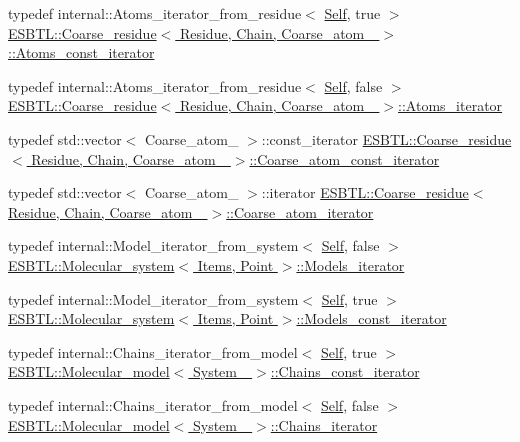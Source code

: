 \begin{DoxyCompactItemize}
\item 
typedef internal\+::\+Atoms\+\_\+iterator\+\_\+from\+\_\+residue$<$ \hyperlink{classESBTL_1_1Coarse__residue}{Self}, true $>$ \hyperlink{group__grp__iters_gabb95e73700fd84dbde6e089927e03a6d}{E\+S\+B\+T\+L\+::\+Coarse\+\_\+residue$<$ Residue, Chain, Coarse\+\_\+atom\+\_\+ $>$\+::\+Atoms\+\_\+const\+\_\+iterator}
\item 
typedef internal\+::\+Atoms\+\_\+iterator\+\_\+from\+\_\+residue$<$ \hyperlink{classESBTL_1_1Coarse__residue}{Self}, false $>$ \hyperlink{group__grp__iters_ga8081408a6d91ed2a777111e2b2651ad4}{E\+S\+B\+T\+L\+::\+Coarse\+\_\+residue$<$ Residue, Chain, Coarse\+\_\+atom\+\_\+ $>$\+::\+Atoms\+\_\+iterator}
\item 
typedef std\+::vector$<$ Coarse\+\_\+atom\+\_\+ $>$\+::const\+\_\+iterator \hyperlink{group__grp__iters_ga5a4a865846cdde342538df7fc03c80ce}{E\+S\+B\+T\+L\+::\+Coarse\+\_\+residue$<$ Residue, Chain, Coarse\+\_\+atom\+\_\+ $>$\+::\+Coarse\+\_\+atom\+\_\+const\+\_\+iterator}
\item 
typedef std\+::vector$<$ Coarse\+\_\+atom\+\_\+ $>$\+::iterator \hyperlink{group__grp__iters_ga09a38741d50d3b7296dae83eb0911e49}{E\+S\+B\+T\+L\+::\+Coarse\+\_\+residue$<$ Residue, Chain, Coarse\+\_\+atom\+\_\+ $>$\+::\+Coarse\+\_\+atom\+\_\+iterator}
\item 
typedef internal\+::\+Model\+\_\+iterator\+\_\+from\+\_\+system$<$ \hyperlink{classESBTL_1_1Molecular__system}{Self}, false $>$ \hyperlink{group__grp__iters_ga752760df14baf1b92dac469d712202bc}{E\+S\+B\+T\+L\+::\+Molecular\+\_\+system$<$ Items, Point $>$\+::\+Models\+\_\+iterator}
\item 
typedef internal\+::\+Model\+\_\+iterator\+\_\+from\+\_\+system$<$ \hyperlink{classESBTL_1_1Molecular__system}{Self}, true $>$ \hyperlink{group__grp__iters_ga6383c53b86af7a7a7376bce06e4febb8}{E\+S\+B\+T\+L\+::\+Molecular\+\_\+system$<$ Items, Point $>$\+::\+Models\+\_\+const\+\_\+iterator}
\item 
typedef internal\+::\+Chains\+\_\+iterator\+\_\+from\+\_\+model$<$ \hyperlink{classESBTL_1_1Molecular__model}{Self}, true $>$ \hyperlink{group__grp__iters_ga32c6b305275f21f3b184688be9d38ffd}{E\+S\+B\+T\+L\+::\+Molecular\+\_\+model$<$ System\+\_\+ $>$\+::\+Chains\+\_\+const\+\_\+iterator}
\item 
typedef internal\+::\+Chains\+\_\+iterator\+\_\+from\+\_\+model$<$ \hyperlink{classESBTL_1_1Molecular__model}{Self}, false $>$ \hyperlink{group__grp__iters_ga763cc293a5df9ae7dd6e31c198dce24b}{E\+S\+B\+T\+L\+::\+Molecular\+\_\+model$<$ System\+\_\+ $>$\+::\+Chains\+\_\+iterator}

\end{DoxyCompactItemize}
